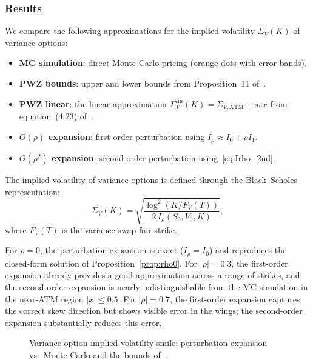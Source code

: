 \documentclass[11pt]{article}
\theoremstyle{definition}
\begin{document}
\subsubsection{Results}

We compare the following approximations for the implied volatility $\Sigma_V(K)$ of variance options:
\begin{itemize}
  \item \textbf{MC simulation}: direct Monte Carlo pricing (orange dots with error bands).
  \item \textbf{PWZ bounds}: upper and lower bounds from Proposition~11 of~\cite{PWZ2025}.
  \item \textbf{PWZ linear}: the linear approximation $\Sigma_V^{\mathrm{lin}}(K) = \Sigma_{V,\mathrm{ATM}} + s_V x$ from equation~(4.23) of~\cite{PWZ2025}.
  \item \textbf{$O(\rho)$ expansion}: first-order perturbation using $I_\rho \approx I_0 + \rho I_1$.
  \item \textbf{$O(\rho^2)$ expansion}: second-order perturbation using~\eqref{eq:Irho_2nd}.
\end{itemize}

The implied volatility of variance options is defined through the Black--Scholes representation:
\begin{equation}
  \Sigma_V(K) = \sqrt{\frac{\log^2(K/F_V(T))}{2\,I_\rho(S_0, V_0, K)}},
\end{equation}
where $F_V(T)$ is the variance swap fair strike.

For $\rho = 0$, the perturbation expansion is exact ($I_\rho = I_0$) and reproduces the closed-form solution of Proposition~\ref{prop:rho0}. For $|\rho| = 0.3$, the first-order expansion already provides a good approximation across a range of strikes, and the second-order expansion is nearly indistinguishable from the MC simulation in the near-ATM region $|x| \leq 0.5$. For $|\rho| = 0.7$, the first-order expansion captures the correct skew direction but shows visible error in the wings; the second-order expansion substantially reduces this error.

\begin{figure}[h]
\centering
{}
\caption{Variance option implied volatility smile: perturbation expansion vs.\ Monte Carlo and the bounds of~\cite{PWZ2025}.}\label{fig:smile}
\end{figure}
\end{document}
